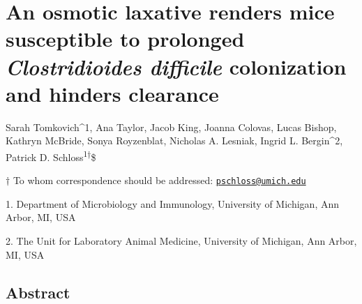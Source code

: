 \documentclass[
  11pt,
]{article}
\author{}
\date{\vspace{-2.5em}}
\begin{document}
\vspace{35mm}

\hypertarget{an-osmotic-laxative-renders-mice-susceptible-to-prolonged-clostridioides-difficile-colonization-and-hinders-clearance}{%
\section{\texorpdfstring{An osmotic laxative renders mice susceptible to
prolonged \emph{Clostridioides difficile} colonization and hinders
clearance}{An osmotic laxative renders mice susceptible to prolonged Clostridioides difficile colonization and hinders clearance}}\label{an-osmotic-laxative-renders-mice-susceptible-to-prolonged-clostridioides-difficile-colonization-and-hinders-clearance}}

\vspace{35mm}

Sarah Tomkovich\^{}1, Ana Taylor, Jacob King, Joanna Colovas, Lucas
Bishop, Kathryn McBride, Sonya Royzenblat, Nicholas A. Lesniak, Ingrid
L. Bergin\^{}2, Patrick D. Schloss\textsuperscript{1\(\dagger\)}\$

\vspace{40mm}

\(\dagger\) To whom correspondence should be addressed:
\href{mailto:pschloss@umich.edu}{\nolinkurl{pschloss@umich.edu}}

1. Department of Microbiology and Immunology, University of Michigan,
Ann Arbor, MI, USA

2. The Unit for Laboratory Animal Medicine, University of Michigan, Ann
Arbor, MI, USA

\newpage
\linenumbers

\hypertarget{abstract}{%
\subsection{Abstract}\label{abstract}}
\end{document}
